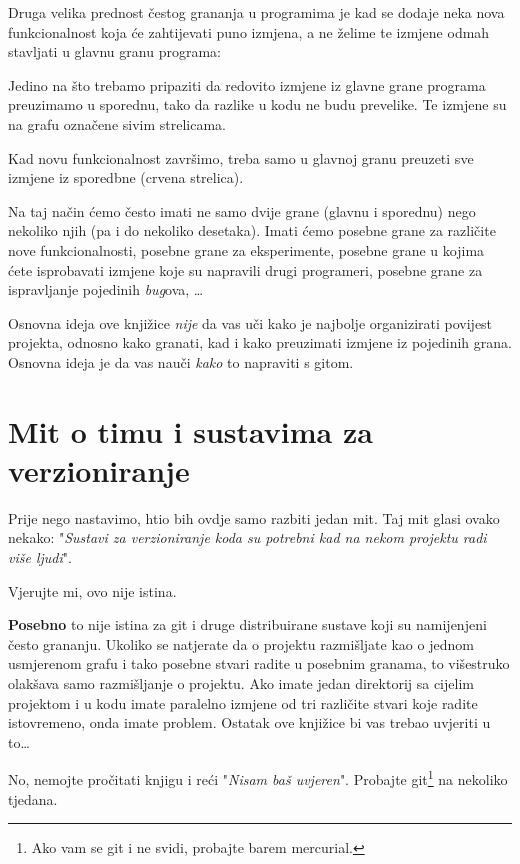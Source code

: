 Druga velika prednost čestog grananja u programima je kad se dodaje neka nova funkcionalnost koja će zahtijevati puno izmjena, a ne želime te izmjene odmah stavljati u glavnu granu programa:



Jedino na što trebamo pripaziti da redovito izmjene iz glavne grane programa preuzimamo u sporednu, tako da razlike u kodu ne budu prevelike. 
Te izmjene su na grafu označene sivim strelicama.

Kad novu funkcionalnost završimo, treba samo u glavnoj granu preuzeti sve izmjene iz sporedbne (crvena strelica).

Na taj način ćemo često imati ne samo dvije grane (glavnu i sporednu) nego nekoliko njih (pa i do nekoliko desetaka). 
Imati ćemo posebne grane za različite nove funkcionalnosti, posebne grane za eksperimente, posebne grane u kojima ćete isprobavati izmjene koje su napravili drugi programeri, posebne grane za ispravljanje pojedinih \emph{bug}ova, \dots

Osnovna ideja ove knjižice \emph{nije} da vas uči kako je najbolje organizirati povijest projekta, odnosno kako granati, kad i kako preuzimati izmjene iz pojedinih grana. Osnovna ideja je da vas nauči \emph{kako} to napraviti s gitom. 

\section*{Mit o timu i sustavima za verzioniranje}

Prije nego nastavimo, htio bih ovdje samo razbiti jedan mit. 
Taj mit glasi ovako nekako: "\emph{Sustavi za verzioniranje koda su potrebni kad na nekom projektu radi više ljudi}".

Vjerujte mi, ovo nije istina.

\textbf{Posebno} to nije istina za git i druge distribuirane sustave koji su namijenjeni često grananju.
Ukoliko se natjerate da o projektu razmišljate kao o jednom usmjerenom grafu i tako posebne stvari radite u posebnim granama, to višestruko olakšava samo razmišljanje o projektu.
Ako imate jedan direktorij sa cijelim projektom i u kodu imate paralelno izmjene od tri različite stvari koje radite istovremeno, onda imate problem.
Ostatak ove knjižice bi vas trebao uvjeriti u to\dots

No, nemojte pročitati knjigu i reći "\emph{Nisam baš uvjeren}". 
Probajte git\footnote{Ako vam se git i ne svidi, probajte barem mercurial.} na nekoliko tjedana.

